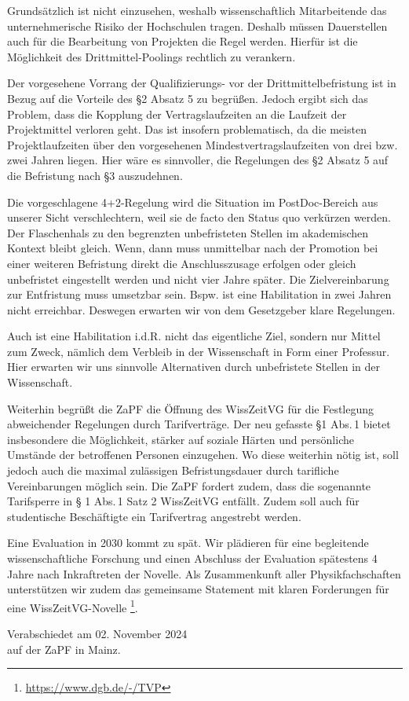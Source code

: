 \documentclass[DIV=calc]{scrartcl}
\begin{document}
Grundsätzlich ist nicht einzusehen, weshalb wissenschaftlich Mitarbeitende das unternehmerische Risiko der Hochschulen tragen. Deshalb müssen Dauerstellen auch für die Bearbeitung von Projekten die Regel werden. Hierfür ist die Möglichkeit des Drittmittel-Poolings rechtlich zu verankern.

Der vorgesehene Vorrang der Qualifizierungs- vor der Drittmittelbefristung ist in Bezug auf die Vorteile des §2 Absatz 5 zu begrüßen. Jedoch ergibt sich das Problem, dass die Kopplung der Vertragslaufzeiten an die Laufzeit der Projektmittel verloren geht. Das ist insofern problematisch, da die meisten Projektlaufzeiten über den vorgesehenen Mindestvertragslaufzeiten von drei bzw. zwei Jahren liegen. Hier wäre es sinnvoller, die Regelungen des §2 Absatz 5 auf die Befristung nach §3 auszudehnen.

Die vorgeschlagene 4+2-Regelung wird die Situation im PostDoc-Bereich aus unserer Sicht verschlechtern, weil sie de facto den Status quo verkürzen werden. Der Flaschenhals zu den begrenzten unbefristeten Stellen im akademischen Kontext bleibt gleich. Wenn, dann muss unmittelbar nach der Promotion bei einer weiteren Befristung direkt die Anschlusszusage erfolgen oder gleich unbefristet eingestellt werden und nicht vier Jahre später. Die Zielvereinbarung zur Entfristung muss umsetzbar sein. Bspw. ist eine Habilitation in zwei Jahren nicht erreichbar. Deswegen erwarten wir von dem Gesetzgeber klare Regelungen.

Auch ist eine Habilitation i.d.R. nicht das eigentliche Ziel, sondern nur Mittel zum Zweck, nämlich dem Verbleib in der Wissenschaft in Form einer Professur. Hier erwarten wir uns sinnvolle Alternativen durch unbefristete Stellen in der Wissenschaft.

Weiterhin begrüßt die ZaPF die Öffnung des WissZeitVG für die Festlegung abweichender Regelungen durch Tarifverträge. Der neu gefasste §1 Abs.\,1 bietet insbesondere die Möglichkeit, stärker auf soziale Härten und persönliche Umstände der betroffenen Personen einzugehen. Wo diese weiterhin nötig ist, soll jedoch auch die maximal zulässigen Befristungsdauer durch tarifliche Vereinbarungen möglich sein. Die ZaPF fordert zudem, dass die sogenannte Tarifsperre in § 1 Abs.\,1 Satz 2 WissZeitVG entfällt. Zudem soll auch für studentische Beschäftigte ein Tarifvertrag angestrebt werden.

Eine Evaluation in 2030 kommt zu spät. Wir plädieren für eine begleitende wissenschaftliche Forschung und einen Abschluss der Evaluation spätestens 4 Jahre nach Inkraftreten der Novelle. Als Zusammenkunft aller Physikfachschaften unterstützen wir zudem das gemeinsame Statement mit klaren Forderungen für eine WissZeitVG-Novelle \footnote{\url{https://www.dgb.de/-/TVP}}.


%
\vfill
\begin{flushright}
	Verabschiedet am 02. November 2024 \\
	auf der ZaPF in Mainz.
\end{flushright}
\end{document}
